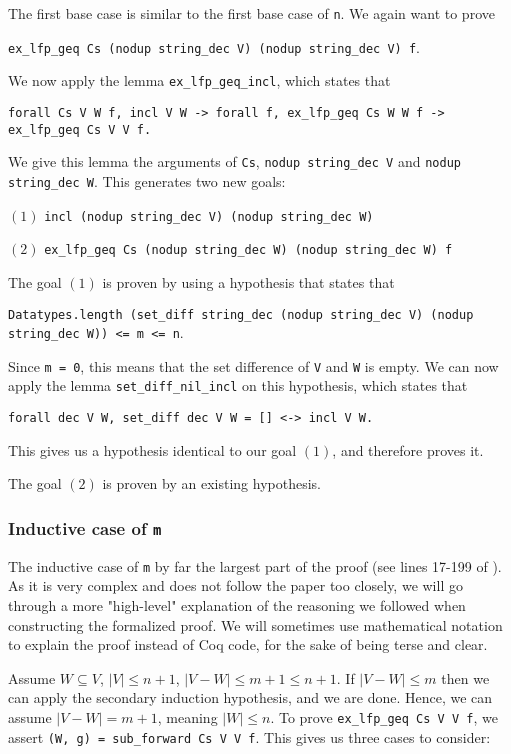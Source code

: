 The first base case is similar to the first base case of \lstinline{n}.
We again want to prove

\tabto{2em}
\lstinline{ex_lfp_geq Cs (nodup string_dec V) (nodup string_dec V) f}.

We now apply the lemma \lstinline{ex_lfp_geq_incl}, which states that

\tabto{2em}
\lstinline{forall Cs V W f, incl V W -> forall f, ex_lfp_geq Cs W W f -> ex_lfp_geq Cs V V f.}

We give this lemma the arguments of \lstinline{Cs}, \lstinline{nodup string_dec V} and \lstinline{nodup string_dec W}.
This generates two new goals:

$(1)$
\tabto{2em}
\lstinline{incl (nodup string_dec V) (nodup string_dec W)}

$(2)$
\tabto{2em}
\lstinline{ex_lfp_geq Cs (nodup string_dec W) (nodup string_dec W) f}

The goal $(1)$ is proven by using a hypothesis that states that

\tabto{2em}
\lstinline{Datatypes.length (set_diff string_dec (nodup string_dec V) (nodup string_dec W)) <= m <= n}.

Since \lstinline{m = 0}, this means that
the set difference of \lstinline{V} and \lstinline{W} is empty.
We can now apply the lemma \lstinline{set_diff_nil_incl} on this hypothesis, which states that

\tabto{2em}
\lstinline{forall dec V W, set_diff dec V W = [] <-> incl V W.}

This gives us a hypothesis identical to our goal $(1)$, and therefore proves it.

The goal $(2)$ is proven by an existing hypothesis.

\subsubsection{Inductive case of \lstinline{m}}
\label{sssec:inductive_case_m}

The inductive case of \lstinline{m} by far the largest part of the proof (see lines 17-199 of ).
As it is very complex and does not follow the paper too closely,
we will go through a more "high-level" explanation of the reasoning
we followed when constructing the formalized proof.
We will sometimes use mathematical notation to explain the proof instead of Coq code,
for the sake of being terse and clear.

Assume $W \subseteq V$, $\lvert V \rvert \leq n + 1$, $\lvert V - W \rvert \leq m + 1 \leq n + 1$.
If $\lvert V - W \rvert \leq m$ then we can apply the secondary induction hypothesis, and we are done.
Hence, we can assume $\lvert V - W \rvert = m + 1$, meaning $\lvert W \rvert \leq n$.
To prove \lstinline{ex_lfp_geq Cs V V f}, we assert \lstinline{(W, g) = sub_forward Cs V V f}.
This gives us three cases to consider:

